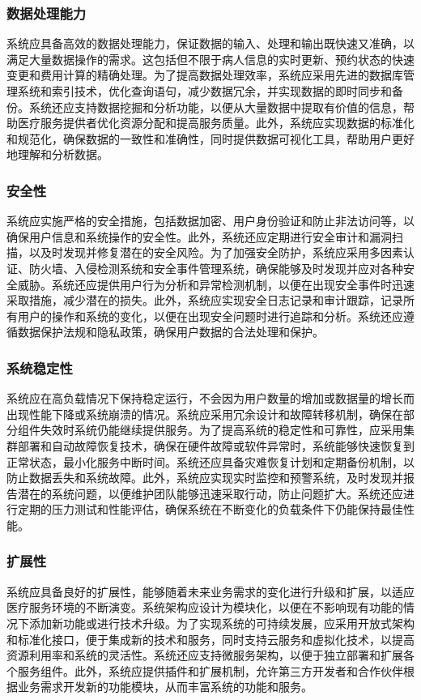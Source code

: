 \subsubsection{数据处理能力}
系统应具备高效的数据处理能力，保证数据的输入、处理和输出既快速又准确，以满足大量数据操作的需求。这包括但不限于病人信息的实时更新、预约状态的快速变更和费用计算的精确处理。为了提高数据处理效率，系统应采用先进的数据库管理系统和索引技术，优化查询语句，减少数据冗余，并实现数据的即时同步和备份。系统还应支持数据挖掘和分析功能，以便从大量数据中提取有价值的信息，帮助医疗服务提供者优化资源分配和提高服务质量。此外，系统应实现数据的标准化和规范化，确保数据的一致性和准确性，同时提供数据可视化工具，帮助用户更好地理解和分析数据。

\subsubsection{安全性}
系统应实施严格的安全措施，包括数据加密、用户身份验证和防止非法访问等，以确保用户信息和系统操作的安全性。此外，系统还应定期进行安全审计和漏洞扫描，以及时发现并修复潜在的安全风险。为了加强安全防护，系统应采用多因素认证、防火墙、入侵检测系统和安全事件管理系统，确保能够及时发现并应对各种安全威胁。系统还应提供用户行为分析和异常检测机制，以便在出现安全事件时迅速采取措施，减少潜在的损失。此外，系统应实现安全日志记录和审计跟踪，记录所有用户的操作和系统的变化，以便在出现安全问题时进行追踪和分析。系统还应遵循数据保护法规和隐私政策，确保用户数据的合法处理和保护。

\subsubsection{系统稳定性}
系统应在高负载情况下保持稳定运行，不会因为用户数量的增加或数据量的增长而出现性能下降或系统崩溃的情况。系统应采用冗余设计和故障转移机制，确保在部分组件失效时系统仍能继续提供服务。为了提高系统的稳定性和可靠性，应采用集群部署和自动故障恢复技术，确保在硬件故障或软件异常时，系统能够快速恢复到正常状态，最小化服务中断时间。系统还应具备灾难恢复计划和定期备份机制，以防止数据丢失和系统故障。此外，系统应实现实时监控和预警系统，及时发现并报告潜在的系统问题，以便维护团队能够迅速采取行动，防止问题扩大。系统还应进行定期的压力测试和性能评估，确保系统在不断变化的负载条件下仍能保持最佳性能。

\subsubsection{扩展性}
系统应具备良好的扩展性，能够随着未来业务需求的变化进行升级和扩展，以适应医疗服务环境的不断演变。系统架构应设计为模块化，以便在不影响现有功能的情况下添加新功能或进行技术升级。为了实现系统的可持续发展，应采用开放式架构和标准化接口，便于集成新的技术和服务，同时支持云服务和虚拟化技术，以提高资源利用率和系统的灵活性。系统还应支持微服务架构，以便于独立部署和扩展各个服务组件。此外，系统应提供插件和扩展机制，允许第三方开发者和合作伙伴根据业务需求开发新的功能模块，从而丰富系统的功能和服务。

